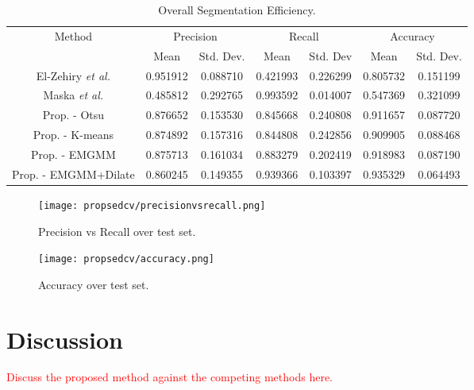 \begin{longtable}{|c|c|c|c|c|c|c|}
	\caption{Overall Segmentation Efficiency.} \label{tab:overallsegmentationefficiency}\\
	\hline 
	\multirow{2}{*}{Method} & \multicolumn{2}{c|}{Precision} & \multicolumn{2}{c|}{Recall} & \multicolumn{2}{c|}{Accuracy}  \\ 
	\hhline{~------}
	& Mean & Std. Dev. & Mean & Std. Dev & Mean & Std. Dev.  \\ 
	\hline	El-Zehiry \textit{et al.}	&	0.951912	&	0.088710	&	0.421993	&	0.226299	&	0.805732	&	0.151199	\\
	\hline \rowcolor{bad}	Maska \textit{et al.}	&	0.485812	&	0.292765	&	0.993592	&	0.014007	&	0.547369	&	0.321099\\
	\hline	Prop. - Otsu	&	0.876652	&	0.153530	&	0.845668	&	0.240808	&	0.911657	&	0.087720	\\
	\hline	Prop. - K-means	&	0.874892	&	0.157316	&	0.844808	&	0.242856	&	0.909905	&	0.088468	\\
	\hline	Prop. - EMGMM	&	0.875713	&	0.161034	&	0.883279	&	0.202419	&	0.918983	&	0.087190	\\
	\hline \rowcolor{closest}	Prop. - EMGMM+Dilate	&	0.860245	&	0.149355	&	0.939366	&	0.103397	&	0.935329	&	0.064493	\\
	\hline
\end{longtable} 

\begin{figure}[!h]
	\centering
	\texttt{[image: propsedcv/precisionvsrecall.png]}
	\caption{Precision vs Recall over test set.}
	\label{fig:precisionvsrecall}
\end{figure}

\begin{figure}[!t]
	\centering
	\texttt{[image: propsedcv/accuracy.png]}
	\caption{Accuracy over test set.}
	\label{fig:accuracyovertestset}
\end{figure}

\section{Discussion}
\label{sec:cvgc_discussion}
\textcolor{red}{Discuss the proposed method against the competing methods here.}

